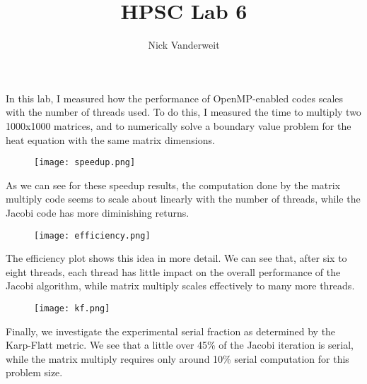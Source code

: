 \documentclass{article}
\title{HPSC Lab 6}
\author{Nick Vanderweit}
\begin{document}
\maketitle

In this lab, I measured how the performance of OpenMP-enabled codes scales with
the number of threads used. To do this, I measured the time to multiply two
1000x1000 matrices, and to numerically solve a boundary value problem for the
heat equation with the same matrix dimensions.

\begin{figure}[h!]
    \centering
    \texttt{[image: speedup.png]}
\end{figure}

As we can see for these speedup results, the computation done by the
matrix multiply code seems to scale about linearly with the number of threads,
while the Jacobi code has more diminishing returns.

\begin{figure}[h!]
    \centering
    \texttt{[image: efficiency.png]}
\end{figure}

The efficiency plot shows this idea in more detail. We can see that, after
six to eight threads, each thread has little impact on the overall performance
of the Jacobi algorithm, while matrix multiply scales effectively to many
more threads.

\begin{figure}[h!]
    \centering
    \texttt{[image: kf.png]}
\end{figure}

Finally, we investigate the experimental serial fraction as determined by the
Karp-Flatt metric. We see that a little over 45\% of the Jacobi iteration is
serial, while the matrix multiply requires only around 10\% serial computation
for this problem size.
\end{document}
